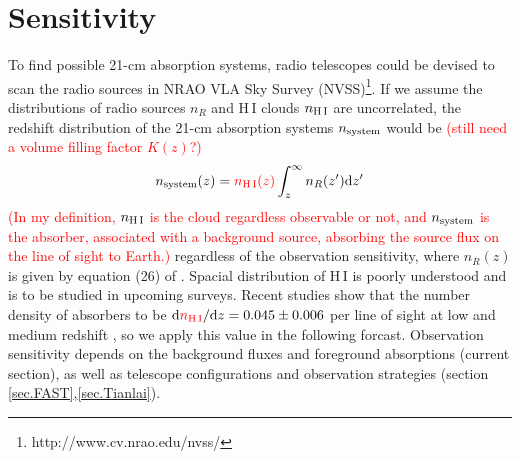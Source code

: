 \documentclass[]{raa}
\newcommand{\diff}{{\rm d}}
\newcommand{\HI}{{H{\small\,I}}}
\newcommand{\tcr}{\textcolor{red}}
\begin{document}
\section{Sensitivity}\label{sec.sensitivity}
To find possible 21-cm absorption systems, radio telescopes
could be devised to scan the radio sources in
NRAO VLA Sky Survey (NVSS)\footnote{http://www.cv.nrao.edu/nvss/}.
If we assume the distributions of radio sources $n_R$ and
{\HI} clouds $n_{\rm \HI}$ are uncorrelated, the redshift
distribution of the 21-cm absorption systems $n_{\rm system}$ would be
\tcr{(still need a volume filling factor $K(z)$?)}
\begin{equation}\label{eq.n_system}
    n_{\rm system}(z)=\tcr{n_{\rm \HI}(z)}\int_z^\infty n_R(z')\diff z'
\end{equation}
\tcr{(In my definition,
$n_{\rm \HI}$ is the cloud regardless observable or not, 
and $n_{\rm system}$ is the absorber, associated with a background source, absorbing the
source flux on the line of sight to Earth.)}
regardless of the observation sensitivity,
where $n_R(z)$ is given by equation (26) of \cite{2010A&ARv..18....1D}.
Spacial distribution of {\HI} is poorly understood and is to be
studied in upcoming surveys.
Recent studies show that the number density of
absorbers to be $\diff \tcr{n_{\rm \HI}}/\diff z= 0.045\pm0.006$
per line of sight at low and medium redshift
\citep{2005ARA&A..43..861W,2007ASSP....3..501Z}, so we apply this value
in the following forcast.
Observation sensitivity depends on the background fluxes and foreground
absorptions (current section), as well as telescope configurations and
observation strategies (section \ref{sec.FAST},\ref{sec.Tianlai}).
\end{document}
